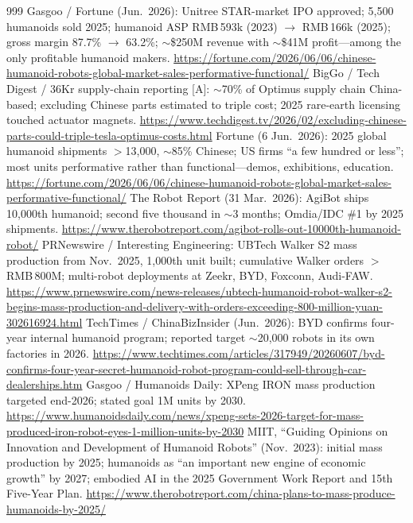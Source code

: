\begin{thebibliography}{999}
 Gasgoo / Fortune (Jun.\ 2026): Unitree STAR-market IPO approved; 5,500 humanoids sold 2025; humanoid ASP RMB\,593k (2023) $\to$ RMB\,166k (2025); gross margin 87.7\% $\to$ 63.2\%; $\sim$\$250M revenue with $\sim$\$41M profit---among the only profitable humanoid makers. \url{https://fortune.com/2026/06/06/chinese-humanoid-robots-global-market-sales-performative-functional/}
 BigGo / Tech Digest / 36Kr supply-chain reporting [A]: $\sim$70\% of Optimus supply chain China-based; excluding Chinese parts estimated to triple cost; 2025 rare-earth licensing touched actuator magnets. \url{https://www.techdigest.tv/2026/02/excluding-chinese-parts-could-triple-tesla-optimus-costs.html}
 Fortune (6 Jun.\ 2026): 2025 global humanoid shipments $>$13,000, $\sim$85\% Chinese; US firms ``a few hundred or less''; most units performative rather than functional---demos, exhibitions, education. \url{https://fortune.com/2026/06/06/chinese-humanoid-robots-global-market-sales-performative-functional/}
 The Robot Report (31 Mar.\ 2026): AgiBot ships 10,000th humanoid; second five thousand in $\sim$3 months; Omdia/IDC \#1 by 2025 shipments. \url{https://www.therobotreport.com/agibot-rolls-out-10000th-humanoid-robot/}
 PRNewswire / Interesting Engineering: UBTech Walker S2 mass production from Nov.\ 2025, 1,000th unit built; cumulative Walker orders $>$RMB\,800M; multi-robot deployments at Zeekr, BYD, Foxconn, Audi-FAW. \url{https://www.prnewswire.com/news-releases/ubtech-humanoid-robot-walker-s2-begins-mass-production-and-delivery-with-orders-exceeding-800-million-yuan-302616924.html}
 TechTimes / ChinaBizInsider (Jun.\ 2026): BYD confirms four-year internal humanoid program; reported target $\sim$20,000 robots in its own factories in 2026. \url{https://www.techtimes.com/articles/317949/20260607/byd-confirms-four-year-secret-humanoid-robot-program-could-sell-through-car-dealerships.htm}
 Gasgoo / Humanoids Daily: XPeng IRON mass production targeted end-2026; stated goal 1M units by 2030. \url{https://www.humanoidsdaily.com/news/xpeng-sets-2026-target-for-mass-produced-iron-robot-eyes-1-million-units-by-2030}
 MIIT, ``Guiding Opinions on Innovation and Development of Humanoid Robots'' (Nov.\ 2023): initial mass production by 2025; humanoids as ``an important new engine of economic growth'' by 2027; embodied AI in the 2025 Government Work Report and 15th Five-Year Plan. \url{https://www.therobotreport.com/china-plans-to-mass-produce-humanoids-by-2025/}

\end{thebibliography}
